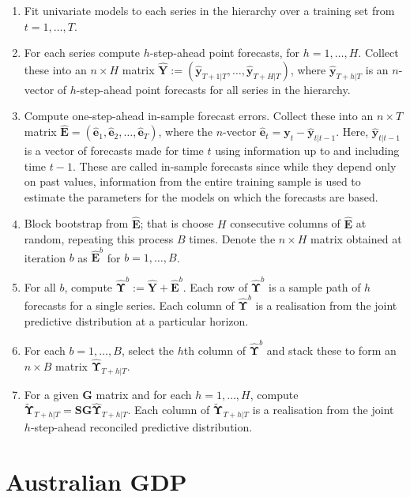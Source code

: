 \documentclass[a4paper, 11pt]{article}
\begin{document}
\begin{enumerate}
	\item Fit univariate models to each series in the hierarchy over a training set from $t=1,\dots,T$.
	\item For each series compute $h$-step-ahead point forecasts, for $h=1,\dots,H$. Collect these into an $n\times H$ matrix $\hat{\bm{Y}}:=(\hat{\bm{y}}_{T+1|T},\dots,\hat{\bm{y}}_{T+H|T})$, where $\hat{\bm{y}}_{T+h|T}$ is an $n$-vector of $h$-step-ahead point forecasts for all series in the hierarchy.
	\item Compute one-step-ahead in-sample forecast errors. Collect these into an $n \times T$ matrix ${\hat{\bm E}}=(\hat{\bm{e}}_1,\hat{\bm{e}}_2,\dots,\hat{\bm{e}}_T)$, where the $n$-vector $\hat{\bm{e}}_t={\bm{y}}_t-\hat{\bm {y}}_{t|t-1}$. Here, $\hat{\bm {y}}_{t|t-1}$ is a vector of forecasts made for time $t$ using information up to and including time $t-1$. These are called in-sample forecasts since while they depend only on past values, information from the entire training sample is used to estimate the parameters for the models on which the forecasts are based.
	\item Block bootstrap from $\hat{\bm{E}}$; that is choose $H$ consecutive columns of $\hat{{\bm E}}$ at random, repeating this process $B$ times. Denote the $n\times H$ matrix obtained at iteration $b$ as $\hat{{\bm E}}^b$ for $b=1,\dots,B$.
	\item For all $b$, compute $\hat{\bm\Upsilon}^b:=\hat{\bm{Y}}+\hat{\bm{E}}^b$. Each row of $\hat{\bm \Upsilon}^b$ is a sample path of $h$ forecasts for a single series. Each column of $\hat{\bm \Upsilon}^b$ is a realisation from the joint predictive distribution at a particular horizon.
	\item For each $b=1,\dots,B$, select the $h$th column of $\hat{\bm \Upsilon}^b$ and stack these to form an $n\times B$ matrix $\hat{\bm{\Upsilon}}_{T+h|T}$.
	\item For a given ${\bm G}$ matrix and for each $h=1,\dots,H$, compute $\tilde{\bm{\Upsilon}}_{T+h|T}={\bm S}{\bm G}\hat{\bm{\Upsilon}}_{T+h|T}$.  Each column of $\tilde{\bm \Upsilon}_{T+h|T}$ is a realisation from the joint $h$-step-ahead reconciled predictive distribution.
\end{enumerate}

\section{Australian GDP}\label{sec:data}
\end{document}
